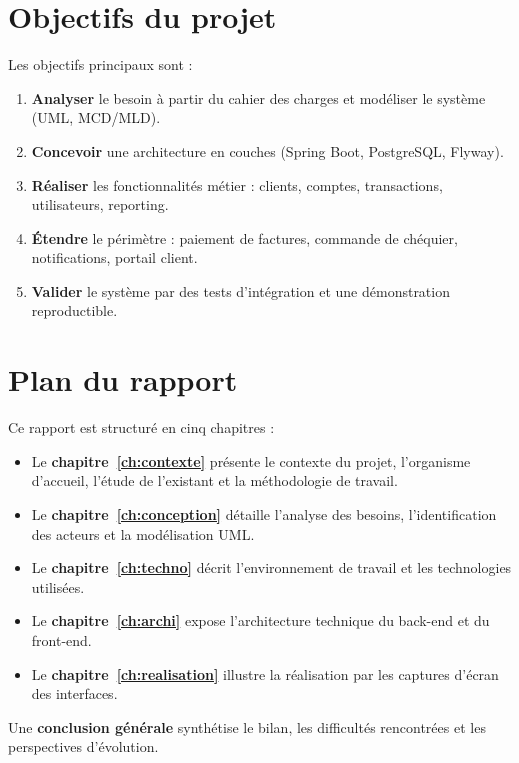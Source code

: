 \section{Objectifs du projet}

Les objectifs principaux sont :
\begin{enumerate}[leftmargin=*]
    \item \textbf{Analyser} le besoin à partir du cahier des charges et modéliser le système (UML, MCD/MLD).
    \item \textbf{Concevoir} une architecture en couches (Spring Boot, PostgreSQL, Flyway).
    \item \textbf{Réaliser} les fonctionnalités métier : clients, comptes, transactions, utilisateurs, reporting.
    \item \textbf{Étendre} le périmètre : paiement de factures, commande de chéquier, notifications, portail client.
    \item \textbf{Valider} le système par des tests d'intégration et une démonstration reproductible.
\end{enumerate}

\section{Plan du rapport}

Ce rapport est structuré en cinq chapitres :
\begin{itemize}[leftmargin=*]
    \item Le \textbf{chapitre~\ref{ch:contexte}} présente le contexte du projet, l'organisme d'accueil, l'étude de l'existant et la méthodologie de travail.
    \item Le \textbf{chapitre~\ref{ch:conception}} détaille l'analyse des besoins, l'identification des acteurs et la modélisation UML.
    \item Le \textbf{chapitre~\ref{ch:techno}} décrit l'environnement de travail et les technologies utilisées.
    \item Le \textbf{chapitre~\ref{ch:archi}} expose l'architecture technique du back-end et du front-end.
    \item Le \textbf{chapitre~\ref{ch:realisation}} illustre la réalisation par les captures d'écran des interfaces.
\end{itemize}

Une \textbf{conclusion générale} synthétise le bilan, les difficultés rencontrées et les perspectives d'évolution.
